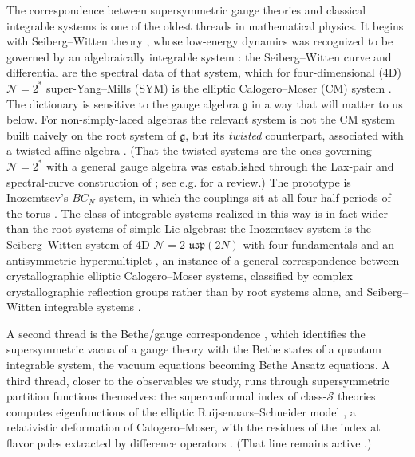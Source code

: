 \documentclass[aps, prx, nofootinbib, twocolumn,amsfonts,amsmath,amssymb,mathtools,superscriptaddress,preprintnumbers,floatfix,reprint]{revtex4-2}
\newcommand{\alg}{\mathfrak{g}}
\begin{document}
The correspondence between supersymmetric gauge theories and classical
integrable systems is one of the oldest threads in mathematical physics.
It begins with Seiberg--Witten theory \cite{Seiberg:1994rs,Seiberg:1994aj},
whose low-energy dynamics was recognized to be governed by an algebraically
integrable system \cite{Gorsky:1995zq,Martinec:1995by,Donagi:1995cf}: the
Seiberg--Witten curve and differential are the spectral data of that system,
which for four-dimensional (4D) $\mathcal{N}=2^\ast$ super-Yang--Mills (SYM) is the elliptic
Calogero--Moser (CM) system
\cite{Calogero:1975ii,Moser:1975qp,Olshanetsky:1981dk,Donagi:1995cf}. The
dictionary is sensitive to the gauge algebra $\alg$ in a way that will matter to us
below. For non-simply-laced algebras the relevant system is not the CM system
built naively on the root system of $\alg$, but its \emph{twisted} counterpart,
associated with a twisted affine algebra
\cite{Inozemtsev:1989,DHoker:1998zuv,Bordner:1998sw,Bordner:1998xs}. (That the twisted systems are 
the ones governing $\mathcal{N}=2^\ast$ with a general gauge algebra was
established through the Lax-pair and spectral-curve construction of
\cite{DHoker:1998yga,DHoker:1999sqz,DHoker:1999hmo,DHoker:1998zuv,DHoker:1998rfc,DHoker:1998xad,DHoker:1997hut}; see e.g. \cite{DHoker:1999yni}
for a review.) The prototype is Inozemtsev's $BC_N$ system, in which the couplings sit at
all four half-periods of the torus \cite{Inozemtsev:1989}. The class of
integrable systems realized in this way is in fact wider than the root systems
of simple Lie algebras: the Inozemtsev system is the Seiberg--Witten system of
4D $\mathcal{N}=2$ $\mathfrak{usp}(2N)$ with four fundamentals and an
antisymmetric hypermultiplet \cite{Argyres:2021iws}, an instance of a general
correspondence between crystallographic elliptic Calogero--Moser systems,
classified by complex crystallographic reflection groups rather than by root
systems alone, and Seiberg--Witten integrable systems \cite{Argyres:2023tfx}.

A second thread is the Bethe/gauge correspondence
\cite{Nekrasov:2009ui,Nekrasov:2009uh}, which identifies the supersymmetric
vacua of a gauge theory with the Bethe states of a quantum integrable system,
the vacuum equations becoming Bethe Ansatz equations. A third thread, closer to the observables we study, runs through supersymmetric partition functions themselves: the superconformal index of class-$\mathcal{S}$
theories computes eigenfunctions of the elliptic Ruijsenaars--Schneider model
\cite{Gaiotto:2012xa,Razamat:2013jxa,Rastelli:2014jja}, a relativistic
deformation of Calogero--Moser, with the residues of the index at flavor poles
extracted by difference operators \cite{Gaiotto:2012xa}. (That line remains active \cite{Nazzal:2023bzu,Kim:2024hxo,Deb:2025ypl,Zeev:2026alb}.)
\end{document}
